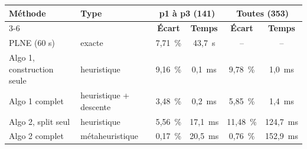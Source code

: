 \begin{tabular}{|l|l|c|c|c|c|}
\hline
\multirow{2}{*}{\textbf{Méthode}} & \multirow{2}{*}{\textbf{Type}} & \multicolumn{2}{c|}{\textbf{p1 à p3 (141)}} & \multicolumn{2}{c|}{\textbf{Toutes (353)}} \\
\cline{3-6}
 & & \textbf{Écart} & \textbf{Temps} & \textbf{Écart} & \textbf{Temps} \\
\hline
PLNE (60 s) & exacte & 7{,}71~\% & 43{,}7~s & -- & -- \\
\hline
Algo 1, construction seule & heuristique & 9{,}16~\% & 0{,}1~ms & 9{,}78~\% & 1{,}0~ms \\
\hline
Algo 1 complet & heuristique + descente & 3{,}48~\% & 0{,}2~ms & 5{,}85~\% & 1{,}4~ms \\
\hline
Algo 2, split seul & heuristique & 5{,}56~\% & 17{,}1~ms & 11{,}48~\% & 124{,}7~ms \\
\hline
Algo 2 complet & métaheuristique & 0{,}17~\% & 20{,}5~ms & 0{,}76~\% & 152{,}9~ms \\
\hline
\end{tabular}
